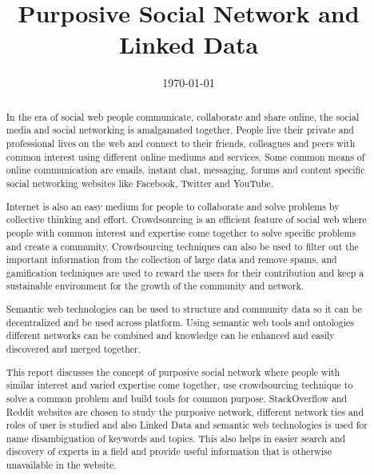 \documentclass{ecsthesis}      %
\begin{document}
\frontmatter
\title      {Purposive Social Network and Linked Data}
\addresses  {\groupname\\\deptname\\\univname}
\date       {\today}
\subject    {}
\keywords   {}
\maketitle
\begin{abstract}
In the era of social web people communicate, collaborate and share online, the social media and social networking is amalgamated together. People live their private and professional lives on the web and connect to their friends, colleagues and peers with common interest using different online mediums and services. Some common means of online communication are emails, instant chat, messaging, forums and content specific social networking websites like Facebook, Twitter and YouTube.

Internet is also an easy medium for people to collaborate and solve problems by collective thinking and effort. Crowdsourcing is an efficient feature of social web where people with common interest and expertise come together to solve specific problems and create a community. Crowdsourcing techniques can also be used to filter out the important information from the collection of large data and remove spams, and gamification techniques are used to reward the users for their contribution and keep a sustainable environment for the growth of the community and network.

Semantic web technologies can be used to structure and community data so it can be decentralized and be used across platform. Using semantic web tools and ontologies different networks can be combined and knowledge can be enhanced and easily discovered and merged together.

This report discusses the concept of purposive social network where people with similar interest and varied expertise come together, use crowdsourcing technique to solve a common problem and build tools for common purpose. StackOverflow and Reddit websites are chosen to study the purposive network, different network ties and roles of user is studied and also Linked Data and semantic web technologies is used for name disambiguation of keywords and topics. This also helps in easier search and discovery of experts in a field and provide useful information that is otherwise unavailable in the website.
\end{abstract}
\tableofcontents
\listoffigures
\listoftables
\end{document}
